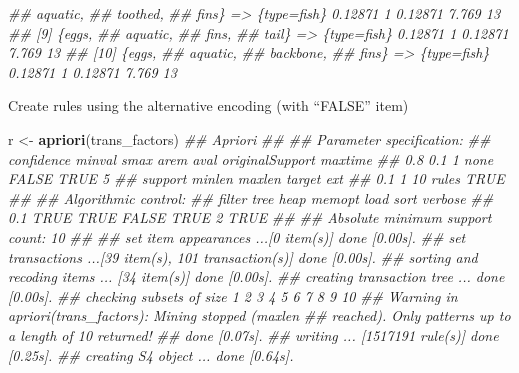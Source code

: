 \documentclass[
  notitlepage]{book}
\newenvironment{Shaded}{\begin{snugshade}}{\end{snugshade}}
\newcommand{\CommentTok}[1]{\textcolor[rgb]{0.56,0.35,0.01}{\textit{#1}}}
\newcommand{\KeywordTok}[1]{\textcolor[rgb]{0.13,0.29,0.53}{\textbf{#1}}}
\newcommand{\NormalTok}[1]{#1}
\newcommand{\StringTok}[1]{\textcolor[rgb]{0.31,0.60,0.02}{#1}}
\begin{document}
\begin{Shaded}
\begin{Highlighting}[]
\CommentTok{\#\#       aquatic,                                                         }
\CommentTok{\#\#       toothed,                                                         }
\CommentTok{\#\#       fins\}      =\textgreater{} \{type=fish\} 0.12871          1  0.12871 7.769    13}
\CommentTok{\#\# [9]  \{eggs,                                                            }
\CommentTok{\#\#       aquatic,                                                         }
\CommentTok{\#\#       fins,                                                            }
\CommentTok{\#\#       tail\}      =\textgreater{} \{type=fish\} 0.12871          1  0.12871 7.769    13}
\CommentTok{\#\# [10] \{eggs,                                                            }
\CommentTok{\#\#       aquatic,                                                         }
\CommentTok{\#\#       backbone,                                                        }
\CommentTok{\#\#       fins\}      =\textgreater{} \{type=fish\} 0.12871          1  0.12871 7.769    13}
\end{Highlighting}
\end{Shaded}

Create rules using the alternative encoding (with ``FALSE'' item)

\begin{Shaded}
\begin{Highlighting}[]
\NormalTok{r \textless{}{-}}\StringTok{ }\KeywordTok{apriori}\NormalTok{(trans\_factors)}
\CommentTok{\#\# Apriori}
\CommentTok{\#\# }
\CommentTok{\#\# Parameter specification:}
\CommentTok{\#\#  confidence minval smax arem  aval originalSupport maxtime}
\CommentTok{\#\#         0.8    0.1    1 none FALSE            TRUE       5}
\CommentTok{\#\#  support minlen maxlen target  ext}
\CommentTok{\#\#      0.1      1     10  rules TRUE}
\CommentTok{\#\# }
\CommentTok{\#\# Algorithmic control:}
\CommentTok{\#\#  filter tree heap memopt load sort verbose}
\CommentTok{\#\#     0.1 TRUE TRUE  FALSE TRUE    2    TRUE}
\CommentTok{\#\# }
\CommentTok{\#\# Absolute minimum support count: 10 }
\CommentTok{\#\# }
\CommentTok{\#\# set item appearances ...[0 item(s)] done [0.00s].}
\CommentTok{\#\# set transactions ...[39 item(s), 101 transaction(s)] done [0.00s].}
\CommentTok{\#\# sorting and recoding items ... [34 item(s)] done [0.00s].}
\CommentTok{\#\# creating transaction tree ... done [0.00s].}
\CommentTok{\#\# checking subsets of size 1 2 3 4 5 6 7 8 9 10}
\CommentTok{\#\# Warning in apriori(trans\_factors): Mining stopped (maxlen}
\CommentTok{\#\# reached). Only patterns up to a length of 10 returned!}
\CommentTok{\#\#  done [0.07s].}
\CommentTok{\#\# writing ... [1517191 rule(s)] done [0.25s].}
\CommentTok{\#\# creating S4 object  ... done [0.64s].}
\end{Highlighting}
\end{Shaded}
\end{document}
